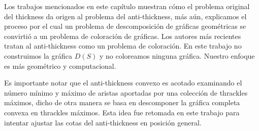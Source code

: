 Los trabajos mencionados en este capítulo muestran cómo el problema original del
thickness da origen al problema del anti-thickness, más aún, explicamos el proceso
por el cual un problema de descomposición de gráficas geométricas se convirtió
a un problema de coloración de gráficas. Los autores más recientes tratan al
anti-thickness como un problema de coloración. En este trabajo no construimos la
gráfica $D(S)$ y no coloreamos ninguna gráfica. Nuestro enfoque es más geométrico
y computacional.

Es importante notar que el anti-thickness convexo es acotado examinando el número mínimo
y máximo de aristas aportadas por una colección de thrackles máximos, dicho de
otra manera se basa en descomponer la gráfica completa convexa en thrackles máximos.
Esta idea fue retomada en este trabajo para intentar ajustar las cotas del anti-thickness
en posición general.
